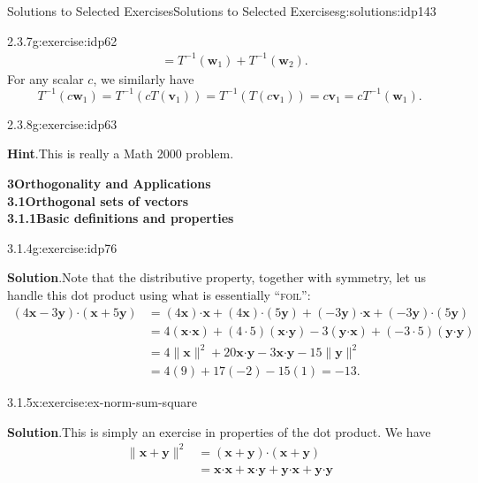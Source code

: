 \documentclass[oneside,10pt,]{book}
\newcommand{\blocktitlefont}{\relax}
\newcommand{\initialism}[1]{\textsc{\MakeLowercase{#1}}}
\numberwithin{equation}{section}
\newcommand{\dotp}{\!\boldsymbol{\cdot}\!}
\newcommand{\len}[1]{\lVert #1\rVert}
\newcommand{\vv}{\mathbf{v}}
\newcommand{\ww}{\mathbf{w}}
\newcommand{\xx}{\mathbf{x}}
\newcommand{\yy}{\mathbf{y}}
\newcommand{\amp}{&}
\begin{document}
\begin{solutions-chapter}{Solutions to Selected Exercises}{}{Solutions to Selected Exercises}{}{}{g:solutions:idp143}
\begin{inlinesolution}{2.3.7}{}{g:exercise:idp62}
\begin{align*}
\amp = T^{-1}(\ww_1)+T^{-1}(\ww_2)\text{.}
\end{align*}
For any scalar \(c\), we similarly have%
\begin{equation*}
T^{-1}(c\ww_1) = T^{-1}(cT(\vv_1))=T^{-1}(T(c\vv_1)) = c\vv_1 = cT^{-1}(\ww_1)\text{.}
\end{equation*}
%
\end{inlinesolution}%
\begin{inlinesolution}{2.3.8}{}{g:exercise:idp63}%
\par\smallskip%
\noindent\textbf{\blocktitlefont Hint}.\hypertarget{g:hint:idp64-back}{}\quad{}This is really a Math 2000 problem.%
\end{inlinesolution}%
\par\medskip
\noindent\textbf{\Large{}3\space\textperiodcentered\space{}Orthogonality and Applications\\
3.1\space\textperiodcentered\space{}Orthogonal sets of vectors\\
3.1.1\space\textperiodcentered\space{}Basic definitions and properties}
\begin{inlinesolution}{3.1.4}{}{g:exercise:idp76}%
\par\smallskip%
\noindent\textbf{\blocktitlefont Solution}.\hypertarget{g:solution:idp164-back}{}\quad{}Note that the distributive property, together with symmetry, let us handle this dot product using what is essentially ``\initialism{FOIL}'':%
\begin{align*}
(4\xx-3\yy)\dotp (\xx+5\yy)\amp = (4\xx)\dotp \xx+(4\xx)\dotp(5\yy)+(-3\yy)\dotp \xx+(-3\yy)\dotp(5\yy)\\
\amp = 4(\xx\dotp\xx)+(4\cdot 5)(\xx\dotp \yy)-3(\yy\dotp \xx)+(-3\cdot 5)(\yy\dotp\yy)\\
\amp = 4\len{\xx}^2+20\xx\dotp\yy-3\xx\dotp\yy-15\len{\yy}^2\\
\amp = 4(9)+17(-2)-15(1) = -13\text{.}
\end{align*}
%
\end{inlinesolution}%
\begin{inlinesolution}{3.1.5}{}{x:exercise:ex-norm-sum-square}%
\par\smallskip%
\noindent\textbf{\blocktitlefont Solution}.\hypertarget{g:solution:idp165-back}{}\quad{}This is simply an exercise in properties of the dot product. We have%
\begin{align*}
\len{\xx+\yy}^2 \amp = (\xx+\yy)\dotp (\xx+\yy) \\
\amp = \xx\dotp \xx+\xx\dotp\yy+\yy\dotp\xx+\yy\dotp\yy\\

\end{align*}
\end{inlinesolution}
\end{solutions-chapter}
\end{document}

